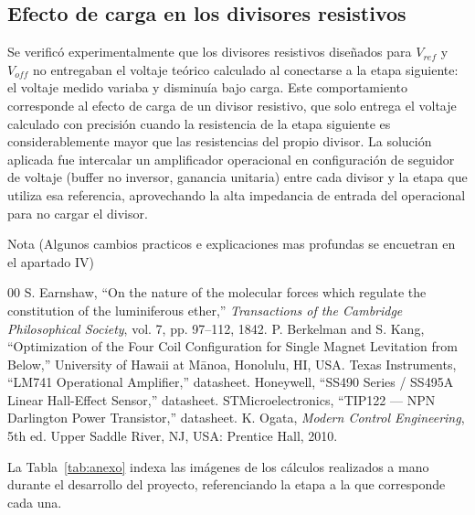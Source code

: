 \documentclass[conference]{IEEEtran}
\begin{document}
\subsection{Efecto de carga en los divisores resistivos}
Se verificó experimentalmente que los divisores resistivos diseñados para $V_{ref}$ y $V_{off}$ no entregaban el voltaje teórico calculado al conectarse a la etapa siguiente: el voltaje medido variaba y disminuía bajo carga. Este comportamiento corresponde al efecto de carga de un divisor resistivo, que solo entrega el voltaje calculado con precisión cuando la resistencia de la etapa siguiente es considerablemente mayor que las resistencias del propio divisor. La solución aplicada fue intercalar un amplificador operacional en configuración de seguidor de voltaje (buffer no inversor, ganancia unitaria) entre cada divisor y la etapa que utiliza esa referencia, aprovechando la alta impedancia de entrada del operacional para no cargar el divisor.

Nota (Algunos cambios practicos e explicaciones mas profundas se encuetran en el apartado IV)
\begin{thebibliography}{00}
 S. Earnshaw, ``On the nature of the molecular forces which regulate the constitution of the luminiferous ether,'' \emph{Transactions of the Cambridge Philosophical Society}, vol. 7, pp. 97--112, 1842.
 P. Berkelman and S. Kang, ``Optimization of the Four Coil Configuration for Single Magnet Levitation from Below,'' University of Hawaii at M\=anoa, Honolulu, HI, USA.
 Texas Instruments, ``LM741 Operational Amplifier,'' datasheet.
 Honeywell, ``SS490 Series / SS495A Linear Hall-Effect Sensor,'' datasheet.
 STMicroelectronics, ``TIP122 --- NPN Darlington Power Transistor,'' datasheet.
 K. Ogata, \emph{Modern Control Engineering}, 5th ed. Upper Saddle River, NJ, USA: Prentice Hall, 2010.
\end{thebibliography}


La Tabla~\ref{tab:anexo} indexa las imágenes de los cálculos realizados a mano durante el desarrollo del proyecto, referenciando la etapa a la que corresponde cada una.
\end{document}
